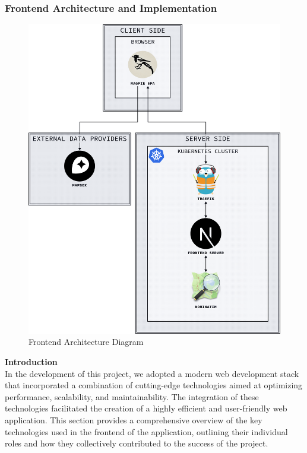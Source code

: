 \subsubsection{Frontend Architecture and Implementation}

\begin{figure}[htbp]
  \centering{}
  \includegraphics[width=0.85\columnwidth]{../d2-diagrams/system-diagram/system-diagram-frontend.png}
  \caption{Frontend Architecture Diagram}
  \label{fig:arcgis}
\end{figure}

\newpage{}

\textbf{Introduction} \\
In the development of this project, we adopted a modern web development stack
that incorporated a combination of cutting{-}edge technologies aimed at
optimizing performance, scalability, and maintainability. The integration of
these technologies facilitated the creation of a highly efficient and
user{-}friendly web application. This section provides a comprehensive overview
of the key technologies used in the frontend of the application, outlining their
individual roles and how they collectively contributed to the success of the
project.

\vspace{0.5cm}

